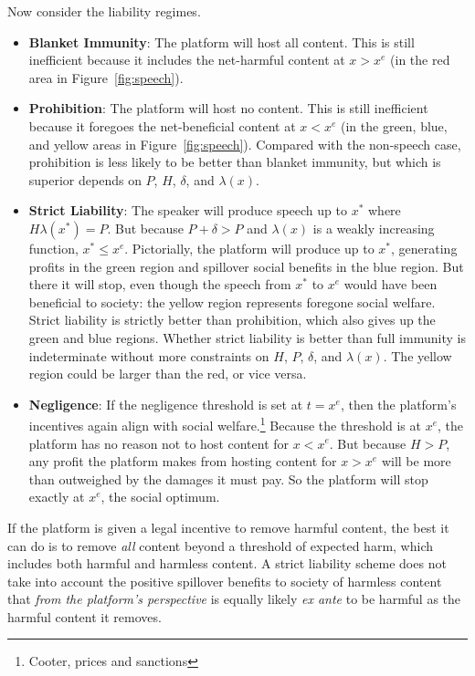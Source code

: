 Now consider the liability regimes.
\begin{itemize}
	\item \textbf{Blanket Immunity}: The platform will host all content. This is still inefficient because it includes the net-harmful content at $x > x^e$ (in the red area in Figure~\ref{fig:speech}).
	 \item \textbf{Prohibition}: The platform will host no content. This is still inefficient because it foregoes the net-beneficial content at $x < x^e$ (in the green, blue, and yellow areas in Figure~\ref{fig:speech}). Compared with the non-speech case, prohibition is less likely to be better than blanket immunity, but which is superior depends on $P$, $H$, $\delta$, and $\lambda(x)$.
	 \item \textbf{Strict Liability}: The speaker will produce speech up to $x^*$ where $H\lambda(x^*) = P$. But because $P + \delta > P$ and $\lambda(x)$ is a weakly increasing function, $x^* \le x^e$. Pictorially, the platform will produce up to $x^*$, generating profits in the green region and spillover social benefits in the blue region. But there it will stop, even though the speech from $x^*$ to $x^e$ would have been beneficial to society: the yellow region represents foregone social welfare. Strict liability is strictly better than prohibition, which also gives up the green and blue regions. Whether strict liability is better than full immunity is indeterminate without more constraints on $H$, $P$, $\delta$, and $\lambda(x)$. The yellow region could be larger than the red, or vice versa.
	 \item \textbf{Negligence}: If the negligence threshold is set at $t=x^e$, then the platform's incentives again align with social welfare.\footnote{Cooter, prices and sanctions} Because the threshold is at $x^e$, the platform has no reason not to host content for $x < x^e$. But because $H > P$, any profit the platform makes from hosting content for $x >  x^e$ will be more than outweighed by the damages it must pay. So the platform will stop exactly at $x^e$, the social optimum.
\end{itemize} 

If the platform is given a legal incentive to remove harmful content, the best it can do is to remove \emph{all} content beyond a threshold of expected harm, which includes both harmful and harmless content.  A strict liability scheme does not take into account the positive spillover benefits to society of harmless content that \emph{from the platform's perspective} is equally likely \emph{ex ante} to be harmful as the harmful content it removes. 






